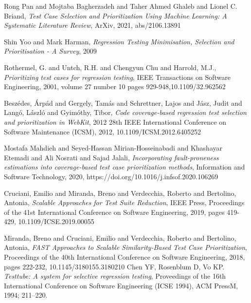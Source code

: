 \documentclass{article}
\begin{document}
\begin{thebibliography}{10}

  Rong Pan and Mojtaba Bagherzadeh and Taher Ahmed Ghaleb and Lionel C. Briand,
  \textit{Test Case Selection and Prioritization Using Machine Learning: A Systematic Literature Review},
  ArXiv, 2021, abs/2106.13891

  Shin Yoo and Mark Harman,
  \textit{Regression Testing Minimisation, Selection and Prioritisation - A Survey},
  2009

  Rothermel, G. and Untch, R.H. and Chengyun Chu and Harrold, M.J.,
  \textit{Prioritizing test cases for regression testing},
  IEEE Transactions on Software Engineering, 2001, volume 27 number 10 pages 929-948,10.1109/32.962562

  Beszédes, Árpád and Gergely, Tamás and Schrettner, Lajos and Jász, Judit and Langó, László and Gyimóthy, Tibor,
  \textit{Code coverage-based regression test selection and prioritization in WebKit},
  2012 28th IEEE International Conference on Software Maintenance (ICSM), 2012, 10.1109/ICSM.2012.6405252

  Mostafa Mahdieh and Seyed-Hassan Mirian-Hosseinabadi and Khashayar Etemadi and Ali Nosrati and Sajad Jalali,
  \textit{Incorporating fault-proneness estimations into coverage-based test case prioritization methods},
  Information and Software Technology, 2020, https://doi.org/10.1016/j.infsof.2020.106269

  Cruciani, Emilio and Miranda, Breno and Verdecchia, Roberto and Bertolino, Antonia,
  \textit{Scalable Approaches for Test Suite Reduction},
  IEEE Press, Proceedings of the 41st International Conference on Software Engineering, 2019, pages 419-429, 10.1109/ICSE.2019.00055

  Miranda, Breno and Cruciani, Emilio and Verdecchia, Roberto and Bertolino, Antonia,
  \textit{FAST Approaches to Scalable Similarity-Based Test Case Prioritization},
  Proceedings of the 40th International Conference on Software Engineering, 2018, pages 222-232, 10.1145/3180155.3180210
  Chen YF, Rosenblum D, Vo KP.
  \textit{Testtube: A system for selective regression testing},
  Proveedings of the 16th International Conference on Software Engineering (ICSE 1994), ACM PressM, 1994; 211–220.

\end{thebibliography}
\end{document}
